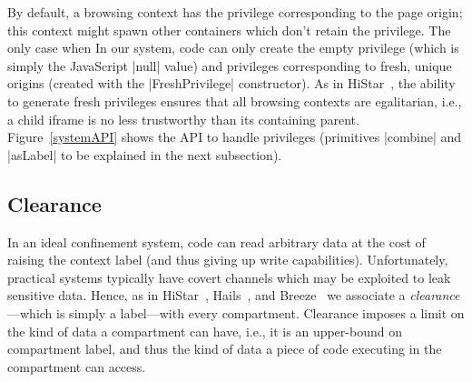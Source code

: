 By default, a browsing context has the privilege corresponding to the
page origin; this context might spawn other containers which don't
retain the privilege.
%
The only case when 
%
In our system, code can only create the empty privilege (which is
simply the JavaScript \js|null| value) and privileges corresponding
to fresh, unique origins (created with the \js|FreshPrivilege|
constructor).
%
As in HiStar~\cite{Zeldovich:2006}, the ability to generate fresh privileges
ensures that all browsing contexts are egalitarian, i.e., a child iframe is no
less trustworthy than its containing parent.  Figure~\ref{systemAPI} shows the
API to handle privileges (primitives \js|combine| and \js|asLabel| to be 
explained in the next subsection). 

\subsection{Clearance}

In an ideal confinement system, code can read arbitrary data at the
cost of raising the context label (and thus giving up write
capabilities).
%
Unfortunately, practical systems typically have covert channels which
may be exploited to leak sensitive data.
%
Hence, as in HiStar~\cite{Zeldovich:2006}, Hails~\cite{giffin:2012:hails}, and
Breeze~\cite{Breeze13} we associate a \emph{clearance}---which is
simply a label---with every compartment.
%
Clearance imposes a limit on the kind of data a compartment can have,
i.e., it is an upper-bound on compartment label, and thus the kind of
data a piece of code executing in the compartment can access.



%



